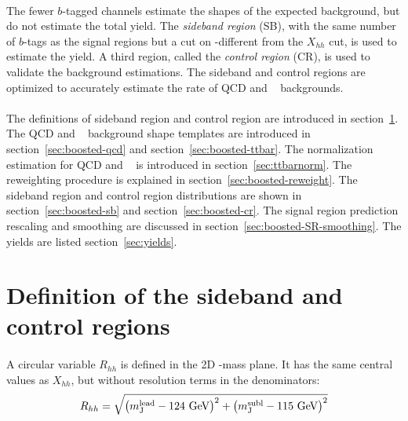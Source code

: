 \paragraph{}
The fewer $b$-tagged channels estimate the shapes of the expected background, but do not estimate the total yield.
The \textit{sideband region} (SB), with the same number of $b$-tags as the signal regions but a cut on \mleadJ-\msublJ different from the $X_{hh}$ cut, is used to estimate the yield.
A third region, called the \textit{control region} (CR), is used to validate the background estimations.
The sideband and control regions are optimized to accurately estimate the rate of QCD and \ttbar~ backgrounds. 

\paragraph{}
The definitions of sideband region and control region are introduced in section~\ref{sec:boosted-SBCR}.
The QCD and \ttbar~ background shape templates are introduced in section~\ref{sec:boosted-qcd} and section~\ref{sec:boosted-ttbar}.
The normalization estimation for QCD and \ttbar~ is introduced in section~\ref{sec:ttbarnorm}.
The reweighting procedure is explained in section~\ref{sec:boosted-reweight}.
The sideband region and control region distributions are shown in section~\ref{sec:boosted-sb} and section~\ref{sec:boosted-cr}.
The signal region prediction rescaling and smoothing are discussed in section~\ref{sec:boosted-SR-smoothing}.
The yields are listed section~\ref{sec:yields}.


\section{Definition of the sideband and control regions}
\label{sec:boosted-SBCR}

\paragraph{}
A circular variable $R_{hh}$ is defined in the 2D \mleadJ-\msublJ mass plane. 
It has the same central values as $X_{hh}$, but without resolution terms in the denominators:
\begin{equation}
\label{eq:boosted_RhhDef}
R_{hh} = \sqrt{\left(m^{\rm lead}_{\rm J} - \text{124 GeV}\right)^2 + \left(m^{\rm subl}_{\rm J} - \text{115 GeV}\right)^2}
\end{equation}

